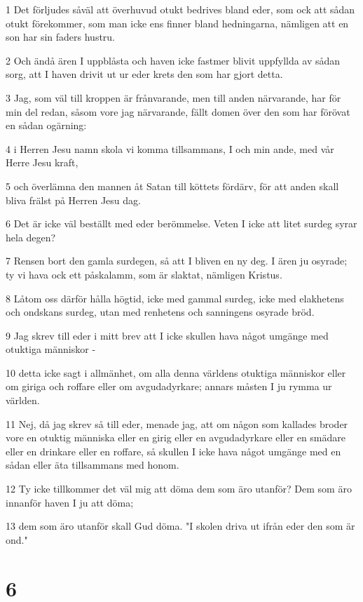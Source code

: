 \par 1 Det förljudes såväl att överhuvud otukt bedrives bland eder, som ock att sådan otukt förekommer, som man icke ens finner bland hedningarna, nämligen att en son har sin faders hustru.
\par 2 Och ändå ären I uppblåsta och haven icke fastmer blivit uppfyllda av sådan sorg, att I haven drivit ut ur eder krets den som har gjort detta.
\par 3 Jag, som väl till kroppen är frånvarande, men till anden närvarande, har för min del redan, såsom vore jag närvarande, fällt domen över den som har förövat en sådan ogärning:
\par 4 i Herren Jesu namn skola vi komma tillsammans, I och min ande, med vår Herre Jesu kraft,
\par 5 och överlämna den mannen åt Satan till köttets fördärv, för att anden skall bliva frälst på Herren Jesu dag.
\par 6 Det är icke väl beställt med eder berömmelse. Veten I icke att litet surdeg syrar hela degen?
\par 7 Rensen bort den gamla surdegen, så att I bliven en ny deg. I ären ju osyrade; ty vi hava ock ett påskalamm, som är slaktat, nämligen Kristus.
\par 8 Låtom oss därför hålla högtid, icke med gammal surdeg, icke med elakhetens och ondskans surdeg, utan med renhetens och sanningens osyrade bröd.
\par 9 Jag skrev till eder i mitt brev att I icke skullen hava något umgänge med otuktiga människor -
\par 10 detta icke sagt i allmänhet, om alla denna världens otuktiga människor eller om giriga och roffare eller om avgudadyrkare; annars måsten I ju rymma ur världen.
\par 11 Nej, då jag skrev så till eder, menade jag, att om någon som kallades broder vore en otuktig människa eller en girig eller en avgudadyrkare eller en smädare eller en drinkare eller en roffare, så skullen I icke hava något umgänge med en sådan eller äta tillsammans med honom.
\par 12 Ty icke tillkommer det väl mig att döma dem som äro utanför? Dem som äro innanför haven I ju att döma;
\par 13 dem som äro utanför skall Gud döma. "I skolen driva ut ifrån eder den som är ond."

\chapter{6}

